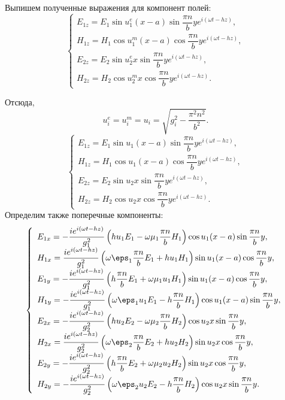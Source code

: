 \documentclass[12pt]{hedsemwork}
\renewcommand{\frac}{\dfrac}
\begin{document}
Выпишем полученные выражения для компонент полей:
\[
    \left\{
    \begin{array}{l}
        E_{1z} = E_1\sin u^e_1 (x-a) \sin \frac{\pi n}{b}y
        e^{i(\omega t - h z)},\\
        H_{1z} = H_1\cos u^m_1 (x-a) \cos \frac{\pi n}{b}y
        e^{i(\omega t - h z)},\\
        E_{2z} = E_2\sin u^e_2 x \sin \frac{\pi n}{b}y
        e^{i(\omega t - h z)},\\
        H_{2z} = H_2\cos u^m_2 x \cos \frac{\pi n}{b}y
        e^{i(\omega t - h z)}.
    \end{array}
    \right.
\]

Отсюда,
\[
    u^e_i = u^m_i = u_i = \sqrt{g_i^2 - \frac{\pi^2n^2}{b^2}}.
\]
\[
    \left\{
    \begin{array}{l}
        E_{1z} = E_1\sin u_1 (x-a) \sin \frac{\pi n}{b}y
        e^{i(\omega t - h z)},\\
        H_{1z} = H_1\cos u_1 (x-a) \cos \frac{\pi n}{b}y
        e^{i(\omega t - h z)},\\
        E_{2z} = E_2\sin u_2 x \sin \frac{\pi n}{b}y
        e^{i(\omega t - h z)},\\
        H_{2z} = H_2\cos u_2 x \cos \frac{\pi n}{b}y
        e^{i(\omega t - h z)}.
    \end{array}
    \right.
\]
Определим также поперечные компоненты:
\[
    \left\{
    \begin{array}{l}
        E_{1x} = -\frac{i e^{i(\omega t - h z)}}{g_1^2}
        \left(h u_1 E_1 - \omega\mu_1\frac{\pi n}{b}H_1\right)
        \cos u_1 (x-a) \sin \frac{\pi n}{b}y,\\
        H_{1x} = \frac{i e^{i(\omega t - h z)}}{g_1^2}
        \left(\omega\eps_1\frac{\pi n}{b}E_1+h u_1 H_1\right)
        \sin u_1 (x-a) \cos \frac{\pi n}{b}y,\\
        E_{1y} = -\frac{i e^{i(\omega t - h z)}}{g_1^2}
        \left(h \frac{\pi n}{b} E_1 + \omega\mu_1u_1H_1\right)
        \sin u_1 (x-a) \cos \frac{\pi n}{b}y,\\
        H_{1y} = -\frac{i e^{i(\omega t - h z)}}{g_1^2}
        \left(\omega\eps_1u_1E_1-h \frac{\pi n}{b} H_1\right)
        \cos u_1 (x-a) \sin \frac{\pi n}{b}y,\\
        E_{2x} = -\frac{i e^{i(\omega t - h z)}}{g_2^2}
        \left(h u_2 E_2 - \omega\mu_2\frac{\pi n}{b}H_2\right)
        \cos u_2 x \sin \frac{\pi n}{b}y,\\
        H_{2x} = \frac{i e^{i(\omega t - h z)}}{g_2^2}
        \left(\omega\eps_2\frac{\pi n}{b}E_2+h u_2 H_2\right)
        \sin u_2 x \cos \frac{\pi n}{b}y,\\
        E_{2y} = -\frac{i e^{i(\omega t - h z)}}{g_2^2}
        \left(h \frac{\pi n}{b} E_2 + \omega\mu_2u_2H_2\right)
        \sin u_2 x \cos \frac{\pi n}{b}y,\\
        H_{2y} = -\frac{i e^{i(\omega t - h z)}}{g_2^2}
        \left(\omega\eps_2u_2E_2-h \frac{\pi n}{b} H_2\right)
        \cos u_2 x \sin \frac{\pi n}{b}y.
    \end{array}
    \right.
\]
\end{document}
